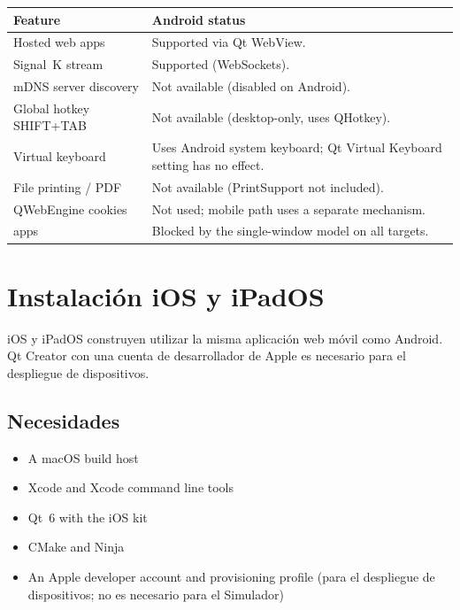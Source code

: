 \begin{longtable}{L{5.2cm}L{8.5cm}}
\toprule
{}
\color{white}\sffamily\bfseries Feature &
\color{white}\sffamily\bfseries Android status \\
\midrule
Hosted web apps          & Supported via Qt WebView. \\
Signal~K stream          & Supported (WebSockets). \\
mDNS server discovery    & Not available (disabled on Android). \\
Global hotkey SHIFT+TAB  & Not available (desktop-only, uses QHotkey). \\
Virtual keyboard         & Uses Android system keyboard; Qt Virtual Keyboard setting has no effect. \\
File printing / PDF      & Not available (PrintSupport not included). \\
QWebEngine cookies       & Not used; mobile path uses a separate mechanism. \\
 apps      & Blocked by the single-window model on all targets. \\
\bottomrule
\end{longtable}

\section{Instalación iOS y iPadOS}
\label{app:ios}

iOS y iPadOS construyen utilizar la misma aplicación web móvil como Android.
Qt Creator con una cuenta de desarrollador de Apple es necesario para el despliegue de dispositivos.

\subsection{Necesidades}

\begin{itemize}
  \item A macOS build host
  \item Xcode and Xcode command line tools
  \item Qt~6 with the iOS kit
  \item CMake and Ninja
  \item An Apple developer account and provisioning profile
(para el despliegue de dispositivos; no es necesario para el Simulador)
\end{itemize}

